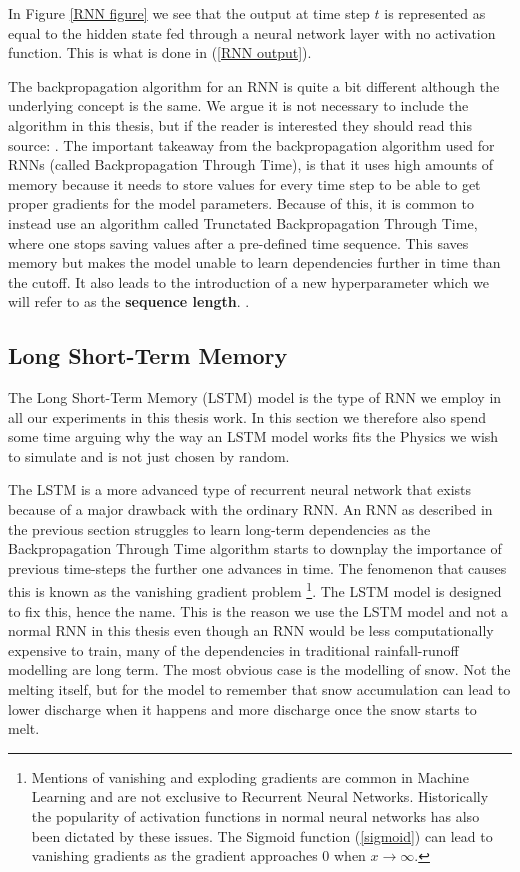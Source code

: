 In Figure \ref{RNN figure} we see that the output at time step $t$ is represented 
as equal to the hidden state fed through a neural network layer with no activation 
function. This is what is done in (\ref{RNN output}).

The backpropagation algorithm for an RNN is quite a bit different although the 
underlying concept is the same. We argue it is not necessary to include the algorithm 
in this thesis, but if the reader is interested they should read this source: \citet{BPTT}.
The important takeaway from the backpropagation algorithm used for RNNs (called 
Backpropagation Through Time), is that it uses high amounts of memory because 
it needs to store values for every time step to be able to get proper gradients 
for the model parameters. Because of this, it is common to instead use an algorithm 
called Trunctated Backpropagation Through Time, where one stops saving values after 
a pre-defined time sequence. This saves memory but makes the model unable to learn 
dependencies further in time than the cutoff. It also leads to the introduction of 
a new hyperparameter which we will refer to as the \textbf{sequence length}. \citationneeded.

\subsection{Long Short-Term Memory}
\label{LSTM Theory}
The Long Short-Term Memory (LSTM) model is the type of RNN we employ in all our 
experiments in this thesis work. In this section we therefore also spend some 
time arguing why the way an LSTM model works fits the Physics we wish to simulate 
and is not just chosen by random. 

The LSTM is a more advanced type of recurrent neural network that exists because 
of a major drawback with the ordinary RNN. An RNN as described in the previous section 
struggles to learn long-term dependencies as the Backpropagation Through Time 
algorithm starts to downplay the importance of previous time-steps the further one 
advances in time. The fenomenon that causes this is known as the vanishing gradient 
problem \citep{bengio1994learning} \citep{graves2012long} \footnote{Mentions of 
vanishing and exploding gradients are common in Machine Learning and are not 
exclusive to Recurrent Neural Networks. Historically the popularity of activation 
functions in normal neural networks has also been dictated by these issues. The 
Sigmoid function (\ref{sigmoid}) can lead to vanishing gradients as the gradient 
approaches $0$ when $x\rightarrow \infty$.}.
The LSTM model is designed to fix this, 
hence the name. This is the reason we use the LSTM model and not a normal RNN in 
this thesis even though an RNN would be less computationally expensive to train, 
many of the dependencies in traditional rainfall-runoff modelling are long term. 
The most obvious case is the modelling of snow. Not the melting itself, but for 
the model to remember that snow accumulation can lead to lower discharge when it 
happens and more discharge once the snow starts to melt.

